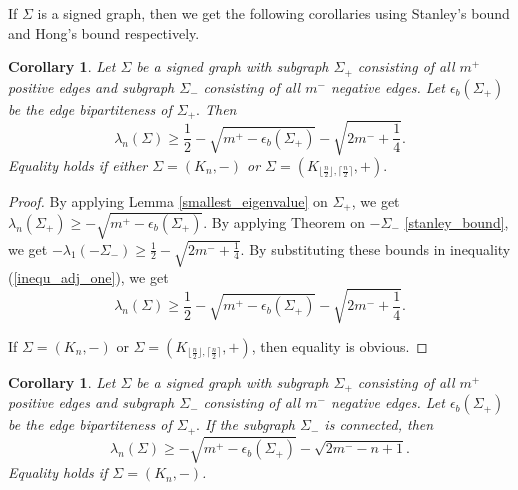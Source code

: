 \documentclass[12pt]{article}
\theoremstyle{plain}
\newtheorem{corollary}[theorem]{Corollary}
\newtheorem*{remark}{Remark}
\numberwithin{equation}{section}
\begin{document}
	
	
	If $\Sigma$ is a signed graph, then we get the following corollaries using Stanley's bound \cite{stanley1987bound} and Hong's bound \cite{yuan1988bound} respectively.
	
	
	\begin{corollary}
		Let $\Sigma$ be a signed graph with subgraph $\Sigma_{+}$ consisting of all $m^{+}$ positive edges and subgraph $\Sigma_{-}$ consisting of all $m^{-}$ negative edges. Let $\epsilon_{b}(\Sigma_{+})$ be the edge bipartiteness of $\Sigma_{+}.$ Then
		\[\lambda_{n}(\Sigma)\geq \frac{1}{2} -\sqrt{m^{+}-\epsilon_{b}(\Sigma_{+})}-\sqrt{2m^{-}+\frac{1}{4}}.\]
		Equality holds if either $\Sigma=(K_{n}, -)$ or $\Sigma=(K_{\lfloor \frac{n}{2}\rfloor, \lceil\frac{n}{2}\rceil}, +).$
	\end{corollary}
	
	\begin{proof}
		By applying Lemma \ref{smallest_eigenvalue} on $\Sigma_{+}$, we get $\lambda_{n}(\Sigma_{+})\geq -\sqrt{m^{+}-\epsilon_{b}(\Sigma_{+})}.$
		By applying Theorem on $-\Sigma_{-}$ \ref{stanley_bound}, we get $-\lambda_{1}(-\Sigma_{-})\geq \frac{1}{2} -\sqrt{2m^{-}+\frac{1}{4}}.$
		By substituting these bounds in inequality (\ref{inequ_adj_one}), we get
		\[\lambda_{n}(\Sigma)\geq \frac{1}{2} -\sqrt{m^{+}-\epsilon_{b}(\Sigma_{+})}-\sqrt{2m^{-}+\frac{1}{4}}.\]
		
		If $\Sigma=(K_{n}, -)$ or $\Sigma=(K_{\lfloor \frac{n}{2}\rfloor, \lceil\frac{n}{2}\rceil}, +)$, then equality is obvious.
	\end{proof}
	
	\begin{corollary}
		Let $\Sigma$ be a signed graph with subgraph $\Sigma_{+}$ consisting of all $m^{+}$ positive edges and subgraph $\Sigma_{-}$ consisting of all $m^{-}$ negative edges. Let $\epsilon_{b}(\Sigma_{+})$ be the edge bipartiteness of $\Sigma_{+}.$ If the subgraph $\Sigma_{-}$ is connected, then
		\[\lambda_{n}(\Sigma)\geq -\sqrt{m^{+}-\epsilon_{b}(\Sigma_{+})}-\sqrt{2m^{-}-n+1}.\]
		Equality holds if $\Sigma=(K_{n}, -)$.
	\end{corollary}
	
\end{document}
